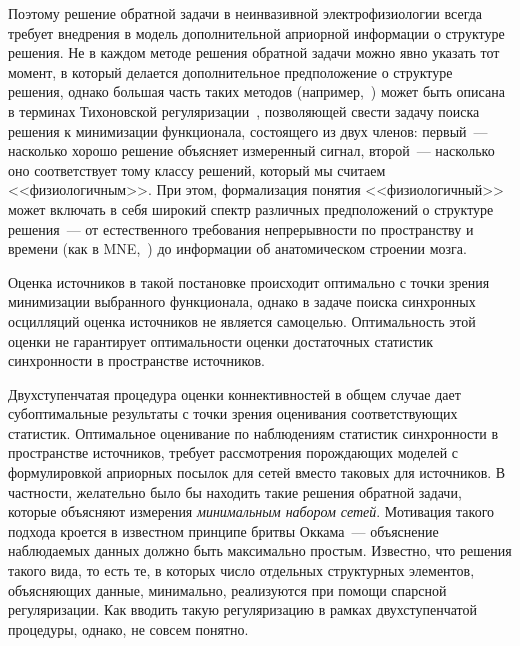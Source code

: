 Поэтому решение обратной задачи в неинвазивной электрофизиологии всегда требует
внедрения в модель дополнительной априорной информации о структуре решения. Не
в каждом методе решения обратной задачи можно явно указать тот момент, в
который делается дополнительное предположение о структуре решения, однако
большая часть таких методов (например,~\cite{Hamalainen1994, Uutela1999, Pascual-Marqui1994, Pascual-Marqui2002})
может быть описана в терминах Тихоновской регуляризации~\cite{tikhonov},
позволяющей свести задачу поиска решения к минимизации
функционала, состоящего из двух членов: первый~--- насколько хорошо решение
объясняет измеренный сигнал, второй~--- насколько оно соответствует тому классу
решений, который мы считаем <<физиологичным>>. При этом, формализация понятия
<<физиологичный>> может включать в себя широкий спектр различных предположений
о структуре решения~--- от естественного требования непрерывности по
пространству и времени (как в MNE,~\cite{Hamalainen1994}) до информации об анатомическом
строении мозга.

Оценка источников в такой постановке происходит оптимально с точки зрения минимизации
выбранного функционала, однако в задаче поиска синхронных осцилляций оценка источников не
является самоцелью. Оптимальность этой оценки не гарантирует оптимальности оценки
достаточных статистик синхронности в пространстве источников.

Двухступенчатая процедура оценки коннективностей в общем случае
дает субоптимальные результаты с точки зрения оценивания соответствующих статистик.
Оптимальное оценивание по наблюдениям статистик синхронности в пространстве источников, требует
рассмотрения порождающих моделей с формулировкой априорных посылок для сетей вместо таковых для
источников. В частности, желательно было бы находить такие решения обратной задачи, которые
объясняют измерения \emph{минимальным набором сетей}. Мотивация такого подхода кроется в известном
принципе бритвы Оккама~--- объяснение наблюдаемых данных должно быть максимально простым.
Известно, что решения такого вида, то есть те, в которых число отдельных структурных элементов,
объясняющих данные, минимально, реализуются при помощи спарсной регуляризации.
Как вводить такую регуляризацию в рамках двухступенчатой процедуры, однако, не совсем
понятно.



